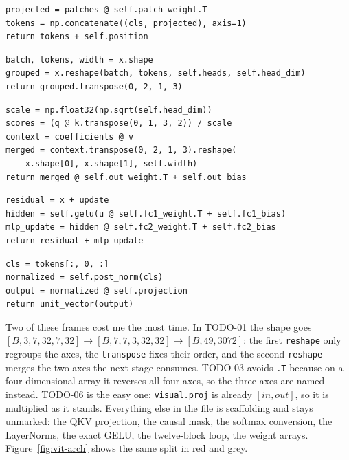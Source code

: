 \documentclass[a4paper,12pt]{article}
\begin{document}
\begin{lstlisting}[title={\color{studentred}\small \textbf{TODO-05}\;\textemdash\;\texttt{embed}\enspace $[B,49,3072]\rightarrow[B,50,768]$}]
projected = patches @ self.patch_weight.T
tokens = np.concatenate((cls, projected), axis=1)
return tokens + self.position
\end{lstlisting}

\begin{lstlisting}[title={\color{studentred}\small \textbf{TODO-02}\;\textemdash\;\texttt{split\_heads}\enspace $[B,N,768]\rightarrow[B,12,N,64]$}]
batch, tokens, width = x.shape
grouped = x.reshape(batch, tokens, self.heads, self.head_dim)
return grouped.transpose(0, 2, 1, 3)
\end{lstlisting}

\begin{lstlisting}[title={\color{studentred}\small \textbf{TODO-03}\;\textemdash\;\texttt{MultiHeadAttention.\_\_call\_\_}\enspace $[B,12,N,64]\rightarrow[B,N,768]$}]
scale = np.float32(np.sqrt(self.head_dim))
scores = (q @ k.transpose(0, 1, 3, 2)) / scale
context = coefficients @ v
merged = context.transpose(0, 2, 1, 3).reshape(
    x.shape[0], x.shape[1], self.width)
return merged @ self.out_weight.T + self.out_bias
\end{lstlisting}

\begin{lstlisting}[title={\color{studentred}\small \textbf{TODO-04}\;\textemdash\;\texttt{TransformerBlock.\_\_call\_\_}\enspace $[B,N,768]\rightarrow[B,N,768]$}]
residual = x + update
hidden = self.gelu(u @ self.fc1_weight.T + self.fc1_bias)
mlp_update = hidden @ self.fc2_weight.T + self.fc2_bias
return residual + mlp_update
\end{lstlisting}

\begin{lstlisting}[title={\color{studentred}\small \textbf{TODO-06}\;\textemdash\;\texttt{ImageEncoder.\_\_call\_\_}\enspace $[B,50,768]\rightarrow[B,512]$}]
cls = tokens[:, 0, :]
normalized = self.post_norm(cls)
output = normalized @ self.projection
return unit_vector(output)
\end{lstlisting}

Two of these frames cost me the most time. In TODO-01 the shape goes
$[B,3,7,32,7,32] \rightarrow [B,7,7,3,32,32] \rightarrow [B,49,3072]$: the first
\texttt{reshape} only regroups the axes, the \texttt{transpose} fixes their
order, and the second \texttt{reshape} merges the two axes the next stage
consumes. TODO-03 avoids \texttt{.T} because on a four-dimensional array it
reverses all four axes, so the three axes are named instead. TODO-06 is the easy one: \texttt{visual.proj}
is already $[in,out]$, so it is multiplied as it stands. Everything else in the
file is scaffolding and stays unmarked: the QKV projection, the causal mask, the
softmax conversion, the LayerNorms, the exact GELU, the twelve-block loop, the
weight arrays. Figure~\ref{fig:vit-arch} shows the same split in red and grey.
\end{document}
